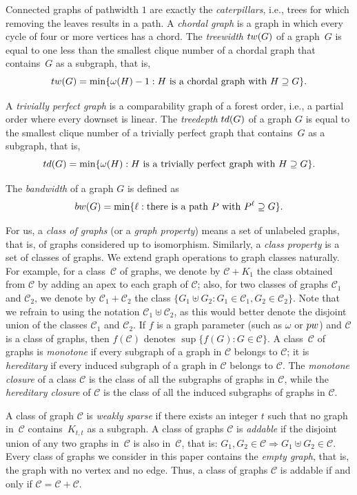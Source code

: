 \documentclass{lmcs}
\newcommand{\Cc}{\mathscr{C}}
\theoremstyle{definition}
\DeclareMathOperator{\join}{+}
\DeclareMathOperator{\union}{\uplus}
\begin{document}
 Connected graphs of pathwidth $1$ are exactly the \emph{caterpillars}, i.e., trees for which removing the leaves results in a path.
A \emph{chordal graph} is a graph in which every cycle of four or more vertices has a chord.
The {\em treewidth} ${\rm tw}(G)$ of a
graph~$G$ is equal to one less than the smallest clique number of a
chordal graph that contains~$G$ as a subgraph, that is,
\[
{\rm tw}(G)=\min\{\omega(H)-1: H \text{ is a chordal graph with }H\supseteq G\}.\]

A {\em trivially perfect graph} is a comparability graph of  a forest order, i.e., a partial order where every downset is linear.
The {\em treedepth} ${\rm td}(G)$ of a graph $G$ is equal to  the smallest clique number of a
trivially perfect graph that contains~$G$ as a subgraph, that is,
\[
{\rm td}(G)=\min\{\omega(H): H \text{ is a trivially perfect graph with }H\supseteq G\}.\]

   The {\em
  bandwidth} of a graph $G$ is defined as
\[
{\rm bw}(G)=\min\{\ell:\text{there is a path } P\text{ with }P^\ell\supseteq
G \}.\]

For us, a \emph{class of graphs} (or a \emph{graph property}) means a set of unlabeled graphs, that is, of graphs considered up to isomorphism. Similarly, a \emph{class property} is a set of classes of graphs.
We extend graph operations to graph classes naturally. For example,
for a class~$\Cc$ of graphs, we denote by $\Cc\join K_1$ the 
class obtained from $\Cc$ by adding an apex to each graph of $\Cc$; also, for two classes of graphs $\Cc_1$ and $\Cc_2$, we denote by $\Cc_1+\Cc_2$ the class $\{G_1\union G_2\colon G_1\in\Cc_1, G_2\in \Cc_2\}$. 
Note that we refrain to using the notation $\Cc_1\union\Cc_2$, as this would better denote the disjoint union of the classes $\Cc_1$ and $\Cc_2$.
If $f$ is a graph parameter (such as $\omega$ or ${\rm pw}$) and $\Cc$ is a class of graphs, then 
$f(\Cc)$ denotes $\sup\{f(G)\colon G\in\Cc\}$.
A class~$\Cc$ of graphs  is \emph{monotone} if every subgraph of a graph in $\Cc$ belongs to $\Cc$; it is \emph{hereditary} if every induced subgraph of a graph in $\Cc$ belongs to $\Cc$.
The {\em monotone closure} of a class $\Cc$ is the class of all the subgraphs of graphs in $\Cc$, while the \emph{hereditary closure} of $\Cc$ is the class of all the induced subgraphs of graphs in $\Cc$.

A class of graph $\Cc$ is \emph{weakly sparse} if there exists an integer $t$ such that no graph in~$\Cc$ contains~$K_{t,t}$ as a subgraph. A class of graphs $\Cc$ is \emph{addable} if the disjoint union of any two graphs in~$\Cc$ is also in~$\Cc$, that is:
$G_1,G_2\in\Cc\Rightarrow G_1\union G_2\in\Cc$. 
Every class of graphs we consider in this paper contains the \emph{empty graph}, that is, the graph with no vertex and no edge. Thus, a class of graphs $\Cc$ is addable if and only if $\Cc=\Cc+\Cc$.
\end{document}
